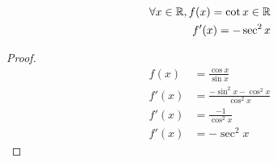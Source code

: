 \begin{proposition}
    \begin{align*}
        \forall x \in \mathbb{R}, f(x) = \cot x \in \mathbb{R}\\
        f'(x) = -\sec^2 x
    \end{align*}
    \begin{proof}
        \begin{align*}
            f(x) &= \frac{\cos x}{\sin x}\\
            f'(x) &= \frac{
                -\sin^2 x - \cos^2 x
            }{\cos^2 x}\\
            f'(x) &= \frac{
                -1
            }{\cos^2 x}\\
            f'(x) &= -\sec^2 x       
        \end{align*}
    \end{proof}
\end{proposition}
